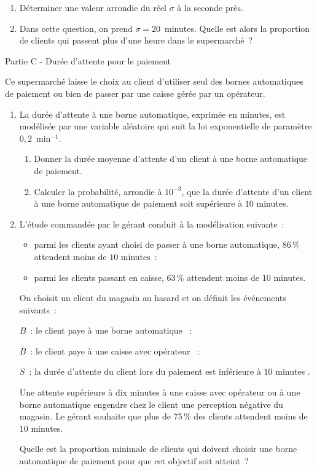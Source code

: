 \medskip
\begin{enumerate}
     \item Déterminer une valeur arrondie du réel $\sigma$ à la seconde près.
     \item Dans cette question, on prend $\sigma = 20$~minutes. Quelle est alors la proportion de clients qui
     passent plus d'une heure dans le supermarché~?
\end{enumerate}
\bigskip
\begin{center}\begin{h3}Partie C - Durée d'attente pour le paiement \end{h3}\end{center}
\medskip
Ce supermarché laisse le choix au client d'utiliser seul des bornes automatiques de paiement ou
bien de passer par une caisse gérée par un opérateur.
\medskip
\begin{enumerate}
     \item La durée d'attente à une borne automatique, exprimée en minutes, est modélisée par une
     variable aléatoire qui suit la loi exponentielle de paramètre $0,2$~min$^{-1}$.
     \begin{enumerate}[label=\alph*.]
          \item Donner la durée moyenne d'attente d'un client à une borne automatique de paiement.
          \item Calculer la probabilité, arrondie à $10^{-3}$, que la durée d'attente d'un client à une borne automatique de paiement soit supérieure à $10$ minutes.
     \end{enumerate}
     \item L'étude commandée par le gérant conduit à la modélisation suivante~:
     \begin{indent}
          \begin{itemize}
               \item parmi les clients ayant choisi de passer à une borne automatique, 86\,\% attendent moins de $10$ minutes~:
               \item parmi les clients passant en caisse, 63\,\% attendent moins de $10$ minutes.
          \end{itemize}
     \end{indent}
     \medskip
     On choisit un client du magasin au hasard et on définit les événements suivants~:
     \par
     $B$~: \og le client paye à une borne automatique \fg{}~:
     \par
     $\overline{B}$~: \og le client paye à une caisse avec opérateur \fg{}~:
     \par
     $S$~: \og la durée d'attente du client lors du paiement est inférieure à $10$ minutes \fg.
     \par
     Une attente supérieure à dix minutes à une caisse avec opérateur ou à une borne automatique
     engendre chez le client une perception négative du magasin. Le gérant souhaite que
     plus de 75\,\% des clients attendent moins de $10$ minutes.
     \par
     Quelle est la proportion minimale de clients qui doivent choisir une borne automatique de
     paiement pour que cet objectif soit atteint~?
\end{enumerate}
